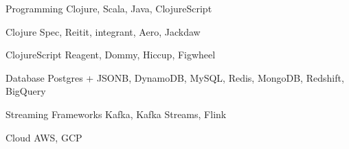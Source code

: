 

\begin{cvskills}

  \cvskill
    {Programming} %
    {Clojure, Scala, Java, ClojureScript} %
    
  \cvskill
    {Clojure} %
    {Spec, Reitit, integrant, Aero, Jackdaw} %
    
  \cvskill
    {ClojureScript} %
    {Reagent, Dommy, Hiccup, Figwheel} %

  \cvskill
    {Database} %
    {Postgres + JSONB, DynamoDB, MySQL, Redis, MongoDB, Redshift, BigQuery} %

  \cvskill
    {Streaming Frameworks} %
    {Kafka, Kafka Streams, Flink} %
    
  \cvskill
    {Cloud} %
    {AWS, GCP} %

\end{cvskills}


